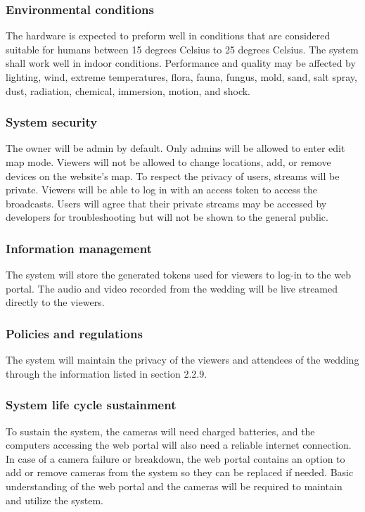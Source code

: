 \documentclass[onecolumn, draftclsnofoot,10pt, compsoc]{IEEEtran}
\begin{document}
    \subsubsection{Environmental conditions}
    The hardware is expected to preform well in conditions that are considered suitable for humans between 15 degrees Celsius to 25 degrees Celsius. 
    The system shall work well in indoor conditions. Performance and quality may be affected by lighting, wind, extreme temperatures, flora, fauna, fungus, mold, sand, salt spray, dust, radiation, chemical, immersion, motion, and shock.
    
    \subsubsection{System security}
    The owner will be admin by default. 
    Only admins will be allowed to enter edit map mode. 
    Viewers will not be allowed to change locations, add, or remove devices on the website's map. 
    To respect the privacy of users, streams will be private. 
    Viewers will be able to log in with an access token to access the broadcasts. Users will agree that their private streams may be accessed by developers for troubleshooting but will not be shown to the general public.
    
    \subsubsection{Information management}
    The system will store the generated tokens used for viewers to log-in to the web portal.
    The audio and video recorded from the wedding will be live streamed directly to the viewers.
    
    \subsubsection{Policies and regulations}
    The system will maintain the privacy of the viewers and attendees of the wedding through the information listed in section 2.2.9.
    
    \subsubsection{System life cycle sustainment}
    To sustain the system, the cameras will need charged batteries, and the computers accessing the web portal will also need a reliable internet connection. 
    In case of a camera failure or breakdown, the web portal contains an option to add or remove cameras from the system so they can be replaced if needed.
    Basic understanding of the web portal and the cameras will be required to maintain and utilize the system.
    
\end{document}
